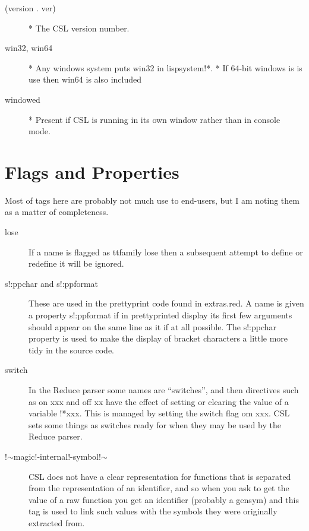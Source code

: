 \documentclass[a4paper,11pt]{article}
\begin{document}
\begin{description}
\item[{\ttfamily  (version . ver)}] 
      * The CSL version number.

\item[{\ttfamily win32}, {\ttfamily win64}] 
      * Any windows system puts {\ttfamily win32} in {\ttfamily lispsystem!*}.
      * If 64-bit windows is is use then {\ttfamily win64} is also included

\item[{\ttfamily windowed}] 
      * Present if CSL is running in its own window rather than in console mode.

\end{description} %

\section{Flags and Properties}
  
Most of tags here are probably not much use to end-users, but I am
noting them as a matter of completeness.
  
\begin{description}

\item [{\ttfamily lose}] 
If a name is flagged as {ttfamily lose} then a subsequent attempt to
define or redefine it will be ignored.

\item [{\ttfamily s!:ppchar} and {\ttfamily s!:ppformat}] 
These are used in the prettyprint code found in {\ttfamily extras.red}. A
name is given a property {\ttfamily s!:ppformat} if in prettyprinted display
its first few arguments should appear on the same line as it if at all
possible. The {\ttfamily s!:ppchar} property is used to make the display of
bracket characters a little more tidy in the source code.

\item [{\ttfamily switch}] 
In the Reduce parser some names are ``switches'', and then directives such
as {\ttfamily on xxx} and {\ttfamily off xx} have the effect of setting or
clearing the value of a variable {\ttfamily !*xxx}. This is managed by
setting the {\ttfamily switch} flag om {\ttfamily xxx}. CSL sets some
things as switches ready for when they may be used by the Reduce parser.

\item [{\ttfamily !$\sim$magic!-internal!-symbol!$\sim$}] 
CSL does not have a clear representation for functions that is separated from
the representation of an identifier, and so when you ask to get the value
of a raw function you get an identifier (probably a gensym) and this
tag is used to link such values with the symbols they were originally
extracted from.

\end{description} %
\end{document}
